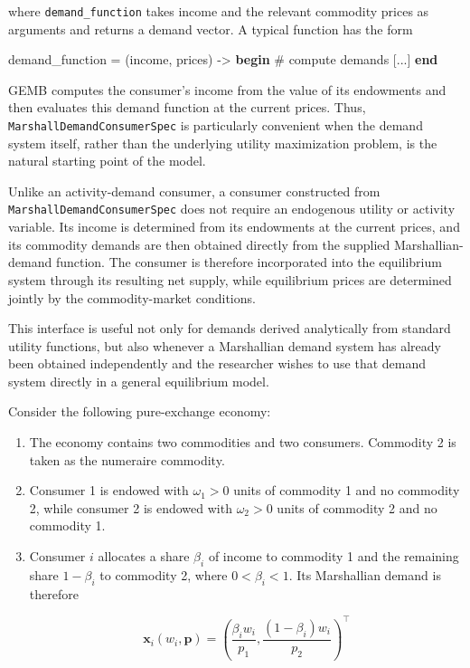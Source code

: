 \documentclass[
  letterpaper,
  DIV=11,
  numbers=noendperiod]{scrreprt}
\newenvironment{Shaded}{\begin{snugshade}}{\end{snugshade}}
\newcommand{\CommentTok}[1]{\textcolor[rgb]{0.37,0.37,0.37}{#1}}
\newcommand{\ControlFlowTok}[1]{\textcolor[rgb]{0.00,0.23,0.31}{\textbf{#1}}}
\newcommand{\NormalTok}[1]{\textcolor[rgb]{0.00,0.23,0.31}{#1}}
\newcommand{\OperatorTok}[1]{\textcolor[rgb]{0.37,0.37,0.37}{#1}}
\begin{document}
where \texttt{demand\_function} takes income and the relevant commodity
prices as arguments and returns a demand vector. A typical function has
the form

\begin{Shaded}
\begin{Highlighting}[]
\NormalTok{demand\_function }\OperatorTok{=}\NormalTok{ (income, prices) }\OperatorTok{{-}\textgreater{}} \ControlFlowTok{begin}
    \CommentTok{\# compute demands}
\NormalTok{    [}\OperatorTok{...}\NormalTok{]}
\ControlFlowTok{end}
\end{Highlighting}
\end{Shaded}

GEMB computes the consumer's income from the value of its endowments and
then evaluates this demand function at the current prices. Thus,
\texttt{MarshallDemandConsumerSpec} is particularly convenient when the
demand system itself, rather than the underlying utility maximization
problem, is the natural starting point of the model.

Unlike an activity-demand consumer, a consumer constructed from
\texttt{MarshallDemandConsumerSpec} does not require an endogenous
utility or activity variable. Its income is determined from its
endowments at the current prices, and its commodity demands are then
obtained directly from the supplied Marshallian-demand function. The
consumer is therefore incorporated into the equilibrium system through
its resulting net supply, while equilibrium prices are determined
jointly by the commodity-market conditions.

This interface is useful not only for demands derived analytically from
standard utility functions, but also whenever a Marshallian demand
system has already been obtained independently and the researcher wishes
to use that demand system directly in a general equilibrium model.

Consider the following pure-exchange economy:

\begin{enumerate}
\def\labelenumi{\arabic{enumi}.}
\item
  The economy contains two commodities and two consumers. Commodity 2 is
  taken as the numeraire commodity.
\item
  Consumer 1 is endowed with \(\omega_1>0\) units of commodity 1 and no
  commodity 2, while consumer 2 is endowed with \(\omega_2>0\) units of
  commodity 2 and no commodity 1.
\item
  Consumer \(i\) allocates a share \(\beta_i\) of income to commodity 1
  and the remaining share \(1-\beta_i\) to commodity 2, where
  \(0<\beta_i<1\). Its Marshallian demand is therefore

  \[
  \mathbf x_i(w_i,\mathbf p)
  =
  \left(
  \frac{\beta_iw_i}{p_1},
  \frac{(1-\beta_i)w_i}{p_2}
  \right)^\top
  \]
\end{enumerate}
\end{document}

